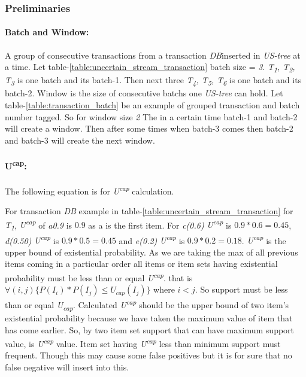 \documentclass[conference]{IEEEtran}
\begin{document}
\subsubsection{Preliminaries}
    \paragraph{Batch and Window: }
    A group of consecutive transactions from a transaction \emph{DB}inserted in \emph{US-tree} at a time. Let table-\ref{table:uncertain_stream_transaction} batch size = \emph{3}. \emph{T\textsubscript{1}, T\textsubscript{2}, T\textsubscript{3}} is one batch and its batch-1. Then next three \emph{T\textsubscript{4}, T\textsubscript{5}, T\textsubscript{6}} is one batch and its batch-2. Window is the size of consecutive batchs one \emph{US-tree} can hold. Let table-\ref{table:transaction_batch} be an example of grouped transaction and batch number tagged. So for window size \emph{2} The in a certain time batch-1 and batch-2 will create a window. Then after some times when batch-3 comes then batch-2 and batch-3 will create the next window.
    
    \paragraph{U\textsuperscript{cap}: }
    The following equation is for \emph{U\textsuperscript{cap}} calculation.
    
    For transaction \emph{DB} example in table-\ref{table:uncertain_stream_transaction} for \emph{T\textsubscript{1}}, \emph{U\textsuperscript{cap}} of \emph{a{0.9}} is $0.9$ as a is the first item. For \emph{c(0.6)} \emph{U\textsuperscript{cap}} is $0.9*0.6=0.45$, \emph{d(0.50)} \emph{U\textsuperscript{cap}} is $0.9*0.5=0.45$ and \emph{e(0.2)} \emph{U\textsuperscript{cap}} is $0.9*0.2=0.18$. \emph{U\textsuperscript{cap}} is the upper bound of existential probability. As we are taking the max of all previous items coming in a particular order all items or item sets having existential probability must be less than or equal \emph{U\textsuperscript{cap}}. that is $\forall(i,j)\{ P(I_i)*P(I_j)\leq U_{cap}(I_j)\}$ where $i < j$. So support must be less than or equal \emph{U\textsubscript{cap}}.
    Calculated \emph{U\textsuperscript{cap}} should be the upper bound of two item's existential probability because we have taken the maximum value of item that has come earlier. So, by two item set support that can have maximum support value, is \emph{U\textsuperscript{cap}} value. Item set having \emph{U\textsuperscript{cap}} less than minimum support must frequent. Though this may cause some false positives but it is for sure that no false negative will insert into this. 
  
      
\end{document}
